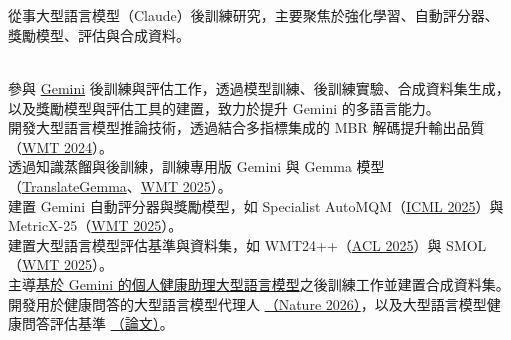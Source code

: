 \vspace{-2mm}



\\

\vspace{1mm}


\\
從事大型語言模型（Claude）後訓練研究，主要聚焦於強化學習、自動評分器、獎勵模型、評估與合成資料。\\

\vspace{-1mm}

\\
參與 \href{https://arxiv.org/pdf/2507.06261}{Gemini} 後訓練與評估工作，透過模型訓練、後訓練實驗、合成資料集生成，以及獎勵模型與評估工具的建置，致力於提升 Gemini 的多語言能力。\\
開發大型語言模型推論技術，透過結合多指標集成的 MBR 解碼提升輸出品質（\href{https://aclanthology.org/2024.wmt-1.109.pdf}{WMT 2024}）。\\
透過知識蒸餾與後訓練，訓練專用版 Gemini 與 Gemma 模型（\href{https://arxiv.org/pdf/2601.09012}{TranslateGemma}、\href{https://aclanthology.org/2025.wmt-1.48.pdf}{WMT 2025}）。\\
建置 Gemini 自動評分器與獎勵模型，如 Specialist AutoMQM（\href{https://openreview.net/pdf?id=Y0Kxvmjkmh}{ICML 2025}）與 MetricX-25（\href{https://aclanthology.org/2025.wmt-1.70.pdf}{WMT 2025}）。\\
建置大型語言模型評估基準與資料集，如 WMT24++（\href{https://aclanthology.org/2025.findings-acl.634.pdf}{ACL 2025}）與 SMOL（\href{https://aclanthology.org/2025.wmt-1.85.pdf}{WMT 2025}）。\\
主導\href{https://research.google/blog/how-we-are-building-the-personal-health-coach/}{基於 Gemini 的個人健康助理大型語言模型}之後訓練工作並建置合成資料集。\\
開發用於健康問答的大型語言模型代理人 \href{https://www.nature.com/articles/s41467-025-67922-y_reference.pdf}{（Nature 2026）}，以及大型語言模型健康問答評估基準 \href{https://arxiv.org/pdf/2305.15525}{（論文）}。\\

